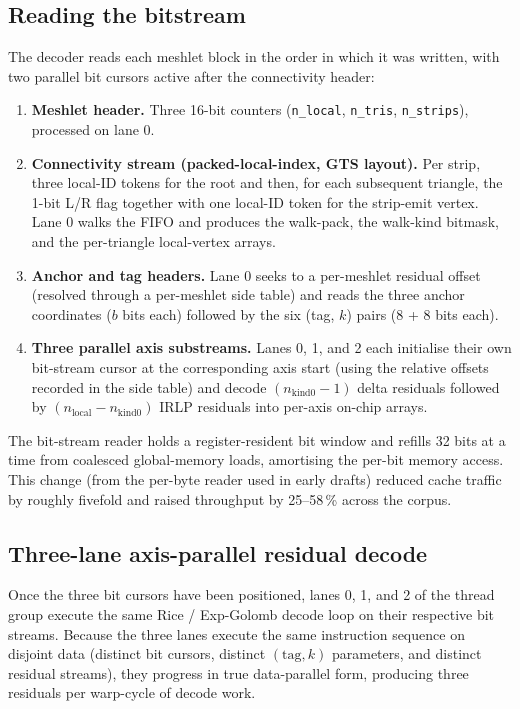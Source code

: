 \documentclass[pdflatex,sn-vancouver-num]{sn-jnl}%
\theoremstyle{thmstyleone}%
\theoremstyle{thmstyletwo}%
\theoremstyle{thmstylethree}%
\begin{document}
\subsection{Reading the bitstream}\label{sec:readorder}

The decoder reads each meshlet block in the order in which it was written, with two parallel bit cursors active after the connectivity header:

\begin{enumerate}
\item \textbf{Meshlet header.} Three 16-bit counters (\texttt{n\_local}, \texttt{n\_tris}, \texttt{n\_strips}), processed on lane 0.
\item \textbf{Connectivity stream (packed-local-index, GTS layout).} Per strip, three local-ID tokens for the root and then, for each subsequent triangle, the 1-bit L/R flag together with one local-ID token for the strip-emit vertex. Lane 0 walks the FIFO and produces the walk-pack, the walk-kind bitmask, and the per-triangle local-vertex arrays.
\item \textbf{Anchor and tag headers.} Lane 0 seeks to a per-meshlet residual offset (resolved through a per-meshlet side table) and reads the three anchor coordinates ($b$ bits each) followed by the six (tag, $k$) pairs (8 + 8 bits each).
\item \textbf{Three parallel axis substreams.} Lanes 0, 1, and 2 each initialise their own bit-stream cursor at the corresponding axis start (using the relative offsets recorded in the side table) and decode $(n_{\text{kind0}} - 1)$ delta residuals followed by $(n_{\text{local}} - n_{\text{kind0}})$ IRLP residuals into per-axis on-chip arrays.
\end{enumerate}

The bit-stream reader holds a register-resident bit window and refills 32 bits at a time from coalesced global-memory loads, amortising the per-bit memory access. This change (from the per-byte reader used in early drafts) reduced cache traffic by roughly fivefold and raised throughput by 25--58\,\% across the corpus.

\subsection{Three-lane axis-parallel residual decode}\label{sec:threelane}

Once the three bit cursors have been positioned, lanes 0, 1, and 2 of the thread group execute the same Rice / Exp-Golomb decode loop on their respective bit streams. Because the three lanes execute the same instruction sequence on disjoint data (distinct bit cursors, distinct $(\text{tag}, k)$ parameters, and distinct residual streams), they progress in true data-parallel form, producing three residuals per warp-cycle of decode work.
\end{document}
